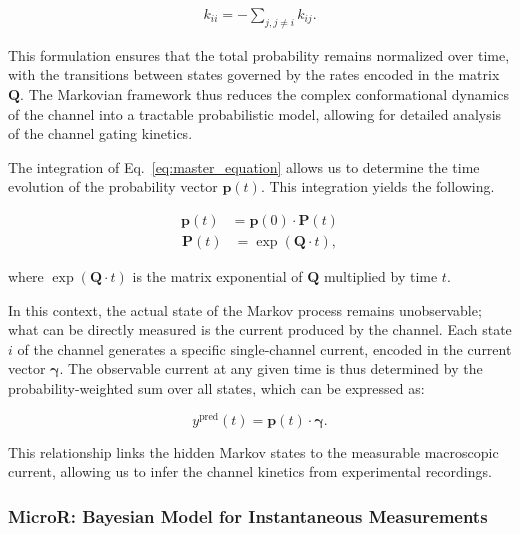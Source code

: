 \documentclass[pdflatex,sn-mathphys-num]{sn-jnl}%
\theoremstyle{thmstyleone}%
\theoremstyle{thmstyletwo}%
\theoremstyle{thmstylethree}%
\begin{document}
\begin{align}
	k_{ii} = -\sum_{j, j \neq i} k_{ij}.
	\label{eq:Q_diagonal_element}
\end{align}

This formulation ensures that the total probability remains normalized over time, with the transitions between states governed by the rates encoded in the matrix \( \boldsymbol{Q} \). The Markovian framework thus reduces the complex conformational dynamics of the channel into a tractable probabilistic model, allowing for detailed analysis of the channel gating kinetics.


The integration of Eq.~\ref{eq:master_equation} allows us to determine the time evolution of the probability vector \( \boldsymbol{p}(t) \). This integration yields the following.


\begin{align}
	\boldsymbol{p}(t) &= \boldsymbol{p}(0) \cdot \boldsymbol{P}(t)
	\label{eq:master_equation_solution}
\end{align}
\begin{align}
	\boldsymbol{P} (t) &= \exp(\boldsymbol{Q} \cdot t),
	\label{eq:Transition_Matrix_definition}
\end{align}


where \( \exp(\boldsymbol{Q} \cdot t) \) is the matrix exponential of \( \boldsymbol{Q} \) multiplied by time \( t \). 

In this context, the actual state of the Markov process remains unobservable; what can be directly measured is the current produced by the channel. Each state \( i \) of the channel generates a specific single-channel current, encoded in the current vector \( \boldsymbol{\gamma} \). The observable current at any given time is thus determined by the probability-weighted sum over all states, which can be expressed as:

\begin{equation}
	y^{\text{pred}}(t) = \boldsymbol{p}(t) \cdot \boldsymbol{\gamma}.
	\label{eq:single_channel_prediction}
\end{equation}

This relationship links the hidden Markov states to the measurable macroscopic current, allowing us to infer the channel kinetics from experimental recordings.

\subsubsection{MicroR: Bayesian Model for Instantaneous Measurements}
\end{document}
